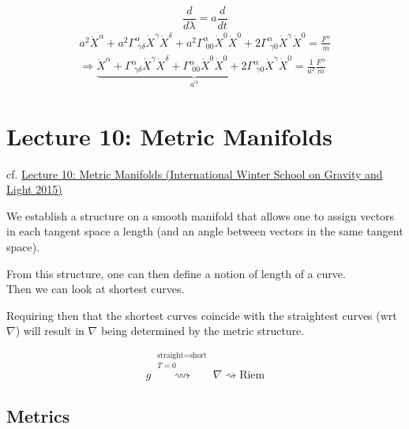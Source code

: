 \documentclass[10pt]{amsart}
\begin{document}
\begin{multicols*}{2}
	\[
	\frac{d}{d\lambda} = a \frac{d}{dt}
	\]
	\[
	\begin{gathered}
	a^2 \ddot{X}^{\alpha} + a^2 \Gamma^{\alpha}_{ \, \, \gamma \delta} \dot{X}^{\gamma} \dot{X}^{\delta} + a^2 \Gamma^{\alpha}_{ \, \, 00 } \dot{X}^0 \dot{X}^0 + 2\Gamma^{\alpha}_{ \, \,\gamma 0} \dot{X}^{\gamma} \dot{X}^{0} =  \frac{ F^{\alpha}}{ m} \\
	\Longrightarrow  \underbrace{ \ddot{X}^{\alpha} +  \Gamma^{\alpha}_{ \, \, \gamma \delta} \dot{X}^{\gamma} \dot{X}^{\delta} +  \Gamma^{\alpha}_{ \, \, 00 } \dot{X}^0 \dot{X}^0 + 2\Gamma^{\alpha}_{ \, \,\gamma 0} \dot{X}^{\gamma} \dot{X}^{0} }_{a^{\alpha} } = \frac{1}{a^2} \frac{ F^{\alpha}}{ m} 
	\end{gathered}
	\]
	
	
	
	\section{Lecture 10: Metric Manifolds}
	
	cf. \href{https://youtu.be/ONCZNwKswn4}{Lecture 10: Metric Manifolds (International Winter School on Gravity and Light 2015)}
	
	We establish a structure on a smooth manifold that allows one to assign vectors in each tangent space a length (and an angle between vectors in the same tangent space).
	
	From this structure, one can then define a notion of length of a curve. \\
	Then we can look at shortest curves.
	
	Requiring then that the shortest curves coincide with the straightest curves (wrt $\nabla$) will result in $\nabla$ being determined by the metric structure.  
	
	\[
	g  \overset{ \substack{ \text{straight} = \text{short} \\ T =0 }  }{ \rightsquigarrow }  \nabla \rightsquigarrow \text{Riem}
	\]
	
	
	\subsection{Metrics}
	

\end{multicols*}
\end{document}
